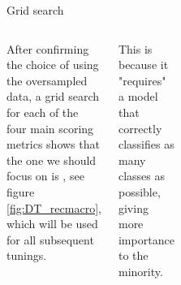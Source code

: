 \begin{frame}{\subsecname\: Grid search}
\begin{columns}[t]
    \justifying
    After confirming the choice of using the oversampled data, a grid search for each of the four main scoring metrics shows that the one we should focus on is , see figure \ref{fig:DT_recmacro}, which will be used for all subsequent tunings.

    This is because it "requires" a model that correctly classifies as many classes as possible, giving more importance to the minority.
        \begin{figure}
            \centering
            \vspace{-2.0em} 
            \begin{columns}[t]
                    \centering
                    \begin{subfigure}[c]{\textwidth}
                        \includegraphics[width=\textwidth]{images/models/DT_precmacro.png}
                        \caption{}
                        \label{fig:DT_precmacro}
                    \end{subfigure} \\
                    \vspace{-.4em} 
                    \begin{subfigure}[c]{\textwidth}

\end{subfigure}
\end{columns}
\end{figure}
\end{columns}
\end{frame}
